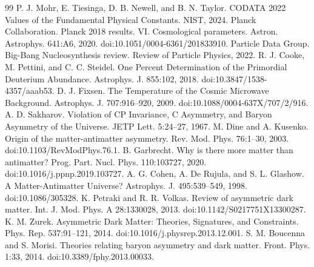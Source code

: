 \documentclass[10pt,twocolumn]{article}
\begin{document}
\begin{thebibliography}{99}
 P. J. Mohr, E. Tiesinga, D. B. Newell, and B. N. Taylor. CODATA 2022 Values of the Fundamental Physical Constants. NIST, 2024.
 Planck Collaboration. Planck 2018 results. VI. Cosmological parameters. Astron. Astrophys. 641:A6, 2020. doi:10.1051/0004-6361/201833910.
 Particle Data Group. Big-Bang Nucleosynthesis review. Review of Particle Physics, 2022.
 R. J. Cooke, M. Pettini, and C. C. Steidel. One Percent Determination of the Primordial Deuterium Abundance. Astrophys. J. 855:102, 2018. doi:10.3847/1538-4357/aaab53.
 D. J. Fixsen. The Temperature of the Cosmic Microwave Background. Astrophys. J. 707:916--920, 2009. doi:10.1088/0004-637X/707/2/916.
 A. D. Sakharov. Violation of CP Invariance, C Asymmetry, and Baryon Asymmetry of the Universe. JETP Lett. 5:24--27, 1967.
 M. Dine and A. Kusenko. Origin of the matter-antimatter asymmetry. Rev. Mod. Phys. 76:1--30, 2003. doi:10.1103/RevModPhys.76.1.
 B. Garbrecht. Why is there more matter than antimatter? Prog. Part. Nucl. Phys. 110:103727, 2020. doi:10.1016/j.ppnp.2019.103727.
 A. G. Cohen, A. De Rujula, and S. L. Glashow. A Matter-Antimatter Universe? Astrophys. J. 495:539--549, 1998. doi:10.1086/305328.
 K. Petraki and R. R. Volkas. Review of asymmetric dark matter. Int. J. Mod. Phys. A 28:1330028, 2013. doi:10.1142/S0217751X13300287.
 K. M. Zurek. Asymmetric Dark Matter: Theories, Signatures, and Constraints. Phys. Rep. 537:91--121, 2014. doi:10.1016/j.physrep.2013.12.001.
 S. M. Boucenna and S. Morisi. Theories relating baryon asymmetry and dark matter. Front. Phys. 1:33, 2014. doi:10.3389/fphy.2013.00033.
\end{thebibliography}
\end{document}
